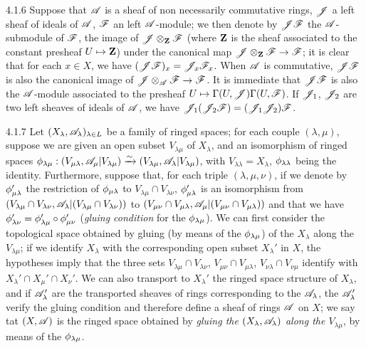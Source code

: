 \begin{env}{4.1.6}
\label{env-0.4.1.6}
Suppose that $\mathscr{A}$ is a sheaf of non necessarily commutative rings, $\mathscr{J}$ a left sheaf
of ideals of $\mathscr{A}$, $\mathscr{F}$ an left $\mathscr{A}$-module; we then denote by $\mathscr{J}\mathscr{F}$ the
$\mathscr{A}$-submodule of $\mathscr{F}$, the image of $\mathscr{J}\otimes_\mathbf{Z}\mathscr{F}$ (where $\mathbf{Z}$ is
the sheaf associated to the constant presheaf $U\mapsto\mathbf{Z}$) under the canonical map
$\mathscr{J}\otimes_\mathbf{Z}\mathscr{F}\to\mathscr{F}$; it is clear that for each $x\in X$, we have
$(\mathscr{J}\mathscr{F})_x=\mathscr{J}_x\mathscr{F}_x$. When $\mathscr{A}$ is commutative, $\mathscr{J}\mathscr{F}$ is also
the canonical image of $\mathscr{J}\otimes_\mathscr{A}\mathscr{F}\to\mathscr{F}$. It is immediate that
$\mathscr{J}\mathscr{F}$ is also the $\mathscr{A}$-module associated to the presheaf
$U\mapsto\Gamma(U,\mathscr{J})\Gamma(U,\mathscr{F})$. If $\mathscr{J}_1$, $\mathscr{J}_2$ are two left sheaves
of ideals of $\mathscr{A}$, we have $\mathscr{J}_1(\mathscr{J}_2\mathscr{F})=(\mathscr{J}_1\mathscr{J}_2)\mathscr{F}$.
\end{env}

\begin{env}{4.1.7}
\label{env-0.4.1.7}
Let $(X_\lambda,\mathscr{A}_\lambda)_{\lambda\in L}$ be a family of ringed spaces; for each couple
$(\lambda,\mu)$, suppose we are given an open subset $V_{\lambda\mu}$ of $X_\lambda$, and an
isomorphism of ringed spaces
$\phi_{\lambda\mu}:(V_{\mu\lambda},\mathscr{A}_\mu|V_{\lambda\mu})\xrightarrow{\sim}
(V_{\lambda\mu},\mathscr{A}_\lambda|V_{\lambda\mu})$, with $V_{\lambda\lambda}=X_\lambda$,
$\phi_{\lambda\lambda}$ being the identity. Furthermore, suppose that, for each triple
$(\lambda,\mu,\nu)$, if we denote by $\phi_{\mu\lambda}'$ the restriction of
$\phi_{\mu\lambda}$ to $V_{\lambda\mu}\cap V_{\lambda\nu}$, $\phi_{\mu\lambda}'$ is an
isomorphism from
$(V_{\lambda\mu}\cap V_{\lambda\nu},\mathscr{A}_\lambda|(V_{\lambda\mu}\cap V_{\lambda\nu}))$ to
$(V_{\mu\nu}\cap V_{\mu\lambda},\mathscr{A}_\mu|(V_{\mu\nu}\cap V_{\mu\lambda}))$ and that we have
$\phi_{\lambda\nu}'=\phi_{\lambda\mu}'\circ\phi_{\mu\nu}'$ (\emph{gluing condition} for
the $\phi_{\lambda\mu}$). We can first consider the topological space obtained by gluing
(by means of the $\phi_{\lambda\mu}$) of the $X_\lambda$
along the $V_{\lambda\mu}$; if we identify $X_\lambda$ with the corresponding open subset
$X_\lambda'$ in $X$, the hypotheses imply that the three sets
$V_{\lambda\mu}\cap V_{\lambda\nu}$, $V_{\mu\nu}\cap V_{\mu\lambda}$,
$V_{\nu\lambda}\cap V_{\nu\mu}$ identify with $X_\lambda'\cap X_\mu'\cap X_\nu'$. We can
also transport to $X_\lambda'$ the ringed space structure of $X_\lambda$, and if
$\mathscr{A}_\lambda'$ are the transported sheaves of rings corresponding to the $\mathscr{A}_\lambda$,
the $\mathscr{A}_\lambda'$ verify the gluing condition  and therefore define a
sheaf of rings $\mathscr{A}$ on $X$; we say tat $(X,\mathscr{A})$ is the ringed space obtained by
\emph{gluing the $(X_\lambda,\mathscr{A}_\lambda)$ along the $V_{\lambda\mu}$}, by means of the
$\phi_{\lambda\mu}$.
\end{env}

